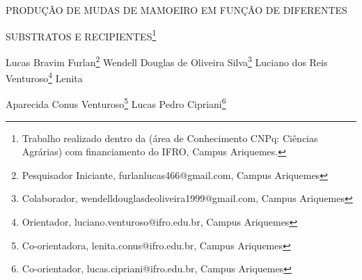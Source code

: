 \documentclass[article,12pt,onesidea,4paper,english,brazil]{abntex2}
\begin{document}
	
	
	\frenchspacing 
	
	\begin{center}
		\LARGE PRODUÇÃO DE MUDAS DE MAMOEIRO EM FUNÇÃO DE DIFERENTES
		
		SUBSTRATOS E RECIPIENTES\footnote{Trabalho realizado dentro da (área de Conhecimento CNPq: Ciências Agrárias) com financiamento
			do IFRO, Campus Ariquemes.}
		
		\normalsize
		Lucas Bravim Furlan\footnote{Pesquisador Iniciante, furlanlucas466@gmail.com, Campus Ariquemes} 
		Wendell Douglas de Oliveira Silva\footnote{Colaborador, wendelldouglasdeoliveira1999@gmail.com, Campus Ariquemes} 
		Luciano dos Reis Venturoso\footnote{Orientador, luciano.venturoso@ifro.edu.br, Campus Ariquemes} 
		Lenita
		
		Aparecida Conus Venturoso\footnote{Co-orientadora, lenita.conus@ifro.edu.br, Campus Ariquemes} 
		Lucas Pedro Cipriani\footnote{Co-orientador, lucas.cipriani@ifro.edu.br, Campus Ariquemes}
	\end{center}
	
\end{document}
